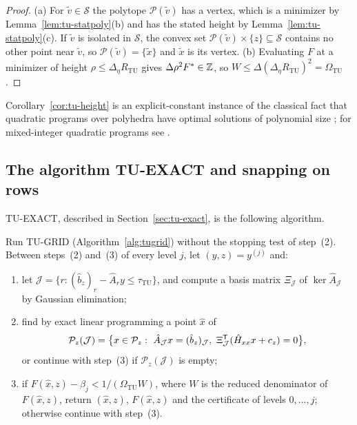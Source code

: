 \begin{proof}
(a) For $\tilde v\in\mathcal S$ the polytope $\mathcal P(\tilde v)$ has a
vertex, which is a minimizer by Lemma~\ref{lem:tu-statpoly}(b) and has the
stated height by Lemma~\ref{lem:tu-statpoly}(c). If $\tilde v$ is isolated in
$\mathcal S$, the convex set $\mathcal P(\tilde v)\times\{z\}\subseteq\mathcal S$
contains no other point near $\tilde v$, so $\mathcal P(\tilde v)=\{\tilde x\}$
and $\tilde x$ is its vertex.
(b) Evaluating $F$ at a minimizer of height $\rho\le\Delta_\eta R_{\mathrm{TU}}$
gives $\Delta\rho^2F^{*}\in\mathbb Z$, so $W\le\Delta(\Delta_\eta R_{\mathrm{TU}})^2=\Omega_{\mathrm{TU}}$.
\end{proof}

Corollary~\ref{cor:tu-height} is an explicit-constant instance of the
classical fact that quadratic programs over polyhedra have optimal solutions
of polynomial size \cite{Vavasis1990}; for mixed-integer quadratic programs see
\cite{DelPiaDeyMolinaro2017}.

\subsection{The algorithm TU-EXACT and snapping on rows}\label{app:tu-snap}

TU-EXACT, described in Section~\ref{sec:tu-exact}, is the following algorithm.

\begin{algorithm}\label{alg:tuexact}
Run TU-GRID (Algorithm~\ref{alg:tugrid}) without the stopping test of
step~(2). Between steps~(2) and~(3) of every level $j$, let $(y,z)=y^{(j)}$
and:
\begin{enumerate}[label=(\roman*)]
\item let $\mathcal J=\{r:(\hat b_z)_r-\hat A_ry\le\tau_{\mathrm{TU}}\}$, and
compute a basis matrix $\Xi_{\mathcal J}$ of $\ker\hat A_{\mathcal J}$ by
Gaussian elimination;
\item find by exact linear programming a point $\hat x$ of
\[
\mathcal P_z(\mathcal J)=\bigl\{x\in\mathcal P_z:\
\hat A_{\mathcal J}x=(\hat b_z)_{\mathcal J},\
\Xi_{\mathcal J}^{\mathsf T}(\hat H_{xx}x+c_z)=0\bigr\},
\]
or continue with step~(3) if $\mathcal P_z(\mathcal J)$ is empty;
\item if $F(\hat x,z)-\beta_j<1/(\Omega_{\mathrm{TU}}W)$, where $W$ is the
reduced denominator of $F(\hat x,z)$, return $(\hat x,z)$, $F(\hat x,z)$ and
the certificate of levels $0,\dots,j$; otherwise continue with step~(3).
\end{enumerate}
\end{algorithm}

